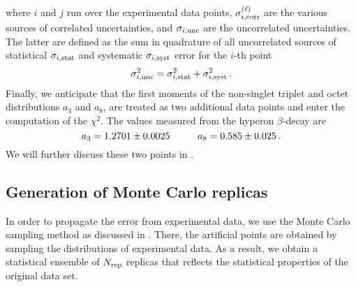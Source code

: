 where $i$ and $j$ run over the experimental data points, $\sigma_{i,\textrm{corr}}^{(\ell)}$ are the various sources of correlated uncertainties, and $\sigma_{i,\textrm{unc}}$ are the uncorrelated uncertainties. The latter are defined as the sum in quadrature of all uncorrelated sources of statistical $\sigma_{i,\textrm{stat}}$ and systematic $\sigma_{i,\textrm{syst}}$ error for the $i$-th point
\begin{equation}
  \sigma_{i,\textrm{unc}}^2 = \sigma_{i,\textrm{stat}}^2 + \sigma_{i,\textrm{syst}}^2 \,.
\end{equation}
Finally, we anticipate that the first moments of the non-singlet triplet and octet distributions $a_3$ and $a_8$, are treated as two additional data points and enter the computation of the $\chi^2$. The values measured from the hyperon $\beta$-decay are \cite{Nakamura_2010}
\begin{equation}
  a_3 = 1.2701 \pm 0.0025 \hspace{10mm} a_8 = 0.585 \pm 0.025 \,.
  \label{eq:a3_a8_values}
\end{equation}
We will further discuss these two points in .

\subsection*{Generation of Monte Carlo replicas}
In order to propagate the error from experimental data, we use the Monte Carlo sampling method as discussed in . There, the artificial points are obtained by sampling the distributions of experimental data. As a result, we obtain a statistical ensemble of $N_{\textrm{rep}}$ replicas that reflects the statistical properties of the original data set.%

